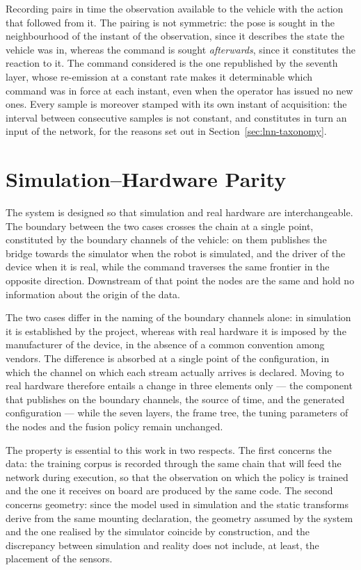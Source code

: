 Recording pairs in time the observation available to the vehicle with the action
that followed from it. The pairing is not symmetric: the pose is sought in the
neighbourhood of the instant of the observation, since it describes the state
the vehicle was in, whereas the command is sought \emph{afterwards}, since it
constitutes the reaction to it. The command considered is the one republished by
the seventh layer, whose re-emission at a constant rate makes it determinable
which command was in force at each instant, even when the operator has issued no
new ones. Every sample is moreover stamped with its own instant of acquisition:
the interval between consecutive samples is not constant, and constitutes in
turn an input of the network, for the reasons set out in
Section~\ref{sec:lnn-taxonomy}.

\section{Simulation--Hardware Parity}
\label{sec:pipeline-parity}

The system is designed so that simulation and real hardware are
interchangeable. The boundary between the two cases crosses the chain at a
single point, constituted by the boundary channels of the vehicle: on them
publishes the bridge towards the simulator when the robot is simulated, and the
driver of the device when it is real, while the command traverses the same
frontier in the opposite direction. Downstream of that point the nodes are the
same and hold no information about the origin of the data.

The two cases differ in the naming of the boundary channels alone: in simulation
it is established by the project, whereas with real hardware it is imposed by
the manufacturer of the device, in the absence of a common convention among
vendors. The difference is absorbed at a single point of the configuration, in
which the channel on which each stream actually arrives is declared. Moving to
real hardware therefore entails a change in three elements only --- the
component that publishes on the boundary channels, the source of time, and the
generated configuration --- while the seven layers, the frame tree, the tuning
parameters of the nodes and the fusion policy remain unchanged.

The property is essential to this work in two respects. The first concerns the
data: the training corpus is recorded through the same chain that will feed the
network during execution, so that the observation on which the policy is trained
and the one it receives on board are produced by the same code. The second
concerns geometry: since the model used in simulation and the static transforms
derive from the same mounting declaration, the geometry assumed by the system
and the one realised by the simulator coincide by construction, and the
discrepancy between simulation and reality does not include, at least, the
placement of the sensors.
